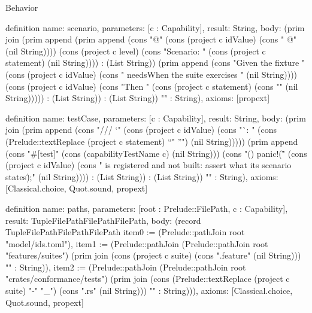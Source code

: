\begin{lexlean}{Behavior}
\begin{semanticmodule}
definition{
  name: scenario,
  parameters: [c : Capability],
  result: String,
  body: (prim join (prim append (prim append (cons "\n  @" (cons (project c idValue) (cons " @" (nil String)))) (cons (project c level) (cons "\n  Scenario: " (cons (project c statement) (nil String)))) : (List String)) (prim append (cons "\n    Given the fixture " (cons (project c idValue) (cons " needs\n    When the suite exercises " (nil String)))) (cons (project c idValue) (cons "\n    Then " (cons (project c statement) (cons "\n" (nil String))))) : (List String)) : (List String)) "" : String),
  axioms: [propext]
}

definition{
  name: testCase,
  parameters: [c : Capability],
  result: String,
  body: (prim join (prim append (cons "\n/// `" (cons (project c idValue) (cons "`: " (cons (Prelude::textReplace (project c statement) "`" "'") (nil String))))) (prim append (cons "\n#[test]\nfn " (cons (capabilityTestName c) (nil String))) (cons "() {\n    panic!(\"" (cons (project c idValue) (cons " is registered and not built: assert what its scenario states\");\n}\n" (nil String)))) : (List String)) : (List String)) "" : String),
  axioms: [Classical.choice, Quot.sound, propext]
}

definition{
  name: paths,
  parameters: [root : Prelude::FilePath, c : Capability],
  result: TupleFilePathFilePathFilePath,
  body: (record TupleFilePathFilePathFilePath {item0 := (Prelude::pathJoin root "model/ids.toml"), item1 := (Prelude::pathJoin (Prelude::pathJoin root "features/suites") (prim join (cons (project c suite) (cons ".feature" (nil String))) "" : String)), item2 := (Prelude::pathJoin (Prelude::pathJoin root "crates/conformance/tests") (prim join (cons (Prelude::textReplace (project c suite) "-" "_") (cons ".rs" (nil String))) "" : String))}),
  axioms: [Classical.choice, Quot.sound, propext]
}


\end{semanticmodule}
\end{lexlean}
